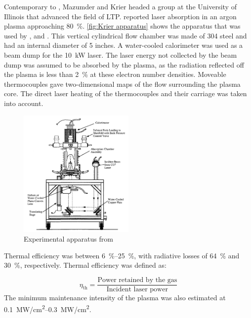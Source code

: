         Contemporary to \textcite{keeferPowerAbsorptionLasersustained1986a}, Mazumder and Krier headed a group at the University of Illinois that advanced the field of LTP. \textcite{krierContinuousWaveLaser1986a} reported laser absorption in an argon plasma approaching \qty{80}{\%}. \autoref{fig:Krier apparatus} shows the apparatus that was used by \textcite{krierContinuousWaveLaser1986a}, \textcite{zerkleLasersustainedArgonPlasmas1990} and \textcite{chenEmissionSpectroscopyCw1989a}. This vertical cylindrical flow chamber was made of 304 steel and had an internal diameter of 5 inches. A water-cooled calorimeter was used as a beam dump for the \qty{10}{kW}  laser. The laser energy not collected by the beam dump was assumed to be absorbed by the plasma, as the radiation reflected off the plasma is less than \qty{2}{\%} at these electron number densities. Moveable thermocouples gave two-dimensional maps of the flow surrounding the plasma core. The direct laser heating of the thermocouples and their carriage was taken into account.
        \begin{figure}[!ht]
            \centering
            \includegraphics[width=0.5\textwidth]{assets/2 background/Illinois (Krier) Apparatus.png}
            \caption{Experimental apparatus from \textcite{zerkleLasersustainedArgonPlasmas1990}}
            \label{fig:Krier apparatus}
        \end{figure}
        Thermal efficiency was between \qtyrange{6}{25}{\%}, with radiative losses of \qty{64}{\%} and \qty{30}{\%}, respectively. Thermal efficiency was defined as:

        \[\eta_\mathrm{th} =  \frac{\text{Power retained by the gas}}{\text{Incident laser power}}\]
        The minimum maintenance intensity of the plasma was also estimated at \qtyrange{0.1}{0.3}{MW/cm^2}.

